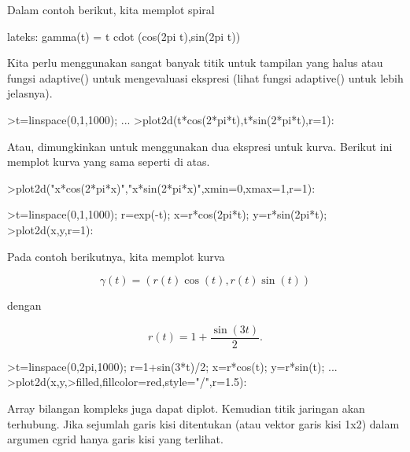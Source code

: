 \documentclass[a4paper,10pt]{article}
\begin{document}
\begin{eulernotebook}
\begin{eulercomment}
\begin{eulercomment}
\begin{eulercomment}
\begin{eulercomment}
\begin{eulercomment}
Dalam contoh berikut, kita memplot spiral

lateks: gamma(t) = t cdot (cos(2pi t),sin(2pi t))

Kita perlu menggunakan sangat banyak titik untuk tampilan yang halus
atau fungsi adaptive() untuk mengevaluasi ekspresi (lihat fungsi
adaptive() untuk lebih jelasnya).
\end{eulercomment}
\begin{eulerprompt}
>t=linspace(0,1,1000); ...
>plot2d(t*cos(2*pi*t),t*sin(2*pi*t),r=1):
\end{eulerprompt}
\begin{eulercomment}
Atau, dimungkinkan untuk menggunakan dua ekspresi untuk kurva. Berikut
ini memplot kurva yang sama seperti di atas.
\end{eulercomment}
\begin{eulerprompt}
>plot2d("x*cos(2*pi*x)","x*sin(2*pi*x)",xmin=0,xmax=1,r=1):
\end{eulerprompt}
\begin{eulerprompt}
>t=linspace(0,1,1000); r=exp(-t); x=r*cos(2pi*t); y=r*sin(2pi*t);
>plot2d(x,y,r=1):
\end{eulerprompt}
\begin{eulercomment}
Pada contoh berikutnya, kita memplot kurva

\end{eulercomment}
\begin{eulerformula}
\[
\gamma(t) = (r(t) \cos(t), r(t) \sin(t))
\]
\end{eulerformula}
\begin{eulercomment}
dengan

\end{eulercomment}
\begin{eulerformula}
\[
r(t) = 1 + \dfrac{\sin(3t)}{2}.
\]
\end{eulerformula}
\begin{eulerprompt}
>t=linspace(0,2pi,1000); r=1+sin(3*t)/2; x=r*cos(t); y=r*sin(t); ...
>plot2d(x,y,>filled,fillcolor=red,style="/",r=1.5):
\end{eulerprompt}
\begin{eulercomment}
Array bilangan kompleks juga dapat diplot. Kemudian titik jaringan
akan terhubung. Jika sejumlah garis kisi ditentukan (atau vektor garis
kisi 1x2) dalam argumen cgrid hanya garis kisi yang terlihat.


\end{eulercomment}
\end{eulercomment}
\end{eulercomment}
\end{eulercomment}
\end{eulercomment}
\end{eulernotebook}
\end{document}
